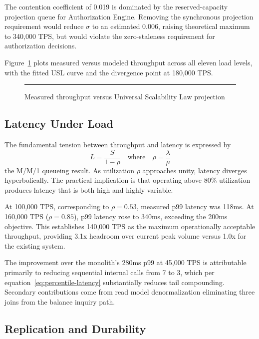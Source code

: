 The contention coefficient of 0.019 is dominated by the reserved-capacity projection queue for Authorization Engine. Removing the synchronous projection requirement would reduce $\sigma$ to an estimated 0.006, raising theoretical maximum to 340,000 TPS, but would violate the zero-staleness requirement for authorization decisions.

Figure~\ref{fig:throughput-scaling-curves} plots measured versus modeled throughput across all eleven load levels, with the fitted USL curve and the divergence point at 180,000 TPS.

\begin{figure}[htbp]
\centering
\rule{0.8\textwidth}{0.4\textwidth}
\caption{Measured throughput versus Universal Scalability Law projection}
\label{fig:throughput-scaling-curves}
\end{figure}

\subsection{Latency Under Load}

The fundamental tension between throughput and latency is expressed by
\begin{equation}
\label{eq:throughput-latency-tradeoff}
L = \frac{S}{1 - \rho} \quad \text{where} \quad \rho = \frac{\lambda}{\mu}
\end{equation}
the M/M/1 queueing result. As utilization $\rho$ approaches unity, latency diverges hyperbolically. The practical implication is that operating above 80\% utilization produces latency that is both high and highly variable.

At 100,000 TPS, corresponding to $\rho = 0.53$, measured p99 latency was 118ms. At 160,000 TPS ($\rho = 0.85$), p99 latency rose to 340ms, exceeding the 200ms objective. This establishes 140,000 TPS as the maximum operationally acceptable throughput, providing 3.1x headroom over current peak volume versus 1.0x for the existing system.

The improvement over the monolith's 280ms p99 at 45,000 TPS is attributable primarily to reducing sequential internal calls from 7 to 3, which per equation~\eqref{eq:percentile-latency} substantially reduces tail compounding. Secondary contributions come from read model denormalization eliminating three joins from the balance inquiry path.

\subsection{Replication and Durability}

